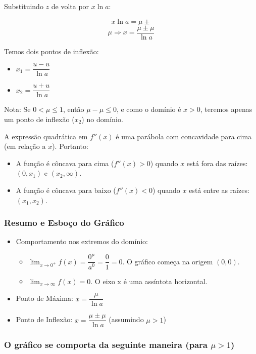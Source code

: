\documentclass[../resumo.tex]{subfiles}
\begin{document}
	Substituindo $z$ de volta por $x \ln a$:

	\[ x \ln a = \mu \pm \]
	\[ \mu \Rightarrow x = \frac{\mu \pm \mu}{\ln a} \]

	Temos dois pontos de inflexão:

	\begin{itemize}
		\item $x_1 = \dfrac{u- u}{\ln a}$
		\item $x_2 = \dfrac{u+ u}{\ln a}$
	\end{itemize}

	Nota: Se $0 < \mu \leq 1$, então $\mu- \mu \leq 0$, e como o domínio é $x > 0$, teremos apenas um 
	ponto de inflexão ($x_2$) no domínio.

	A expressão quadrática em $f''(x)$ é uma parábola com concavidade para cima (em relação a $x$).
	Portanto:

	\begin{itemize}
		\item A função é côncava para cima ($f''(x) > 0$) quando $x$ está fora das raízes: $(0,x_1)$ e $(x_2,\infty)$.
		\item A função é côncava para baixo ($f''(x) < 0$) quando $x$ está entre as raízes: $(x_1,x_2)$.
	\end{itemize}

	\subsubsection{Resumo e Esboço do Gráfico}

	\begin{itemize}
		\item Comportamento nos extremos do domínio:
			\begin{itemize}
				\item $\lim_{x\to 0^+} f(x) = \dfrac{0^\mu}{a^0} = \dfrac{0}{1} = 0$. O gráfico começa na origem $(0,0)$.
				\item $\lim_{x\to \infty} f(x) = 0$. O eixo x é uma assíntota horizontal.
			\end{itemize}
		\item Ponto de Máxima: $x = \dfrac{\mu}{\ln a}$
		\item Ponto de Inflexão: $x = \dfrac{\mu \pm \mu}{\ln a}$ (assumindo $\mu > 1$)
	\end{itemize}

	\subsubsection{O gráfico se comporta da seguinte maneira (para $\mu > 1$)}
\end{document}
